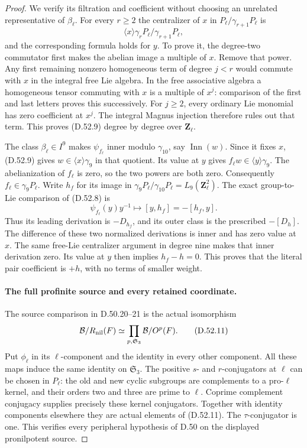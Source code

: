 \begin{proof}
We verify its filtration and coefficient without choosing an
unrelated representative of \(\beta_\ell\). For every
\(r\geq2\) the centralizer of \(x\) in
\(P_\ell/\gamma_{r+1}P_\ell\) is
\[
       \langle x\rangle\gamma_rP_\ell/\gamma_{r+1}P_\ell,
 \tag{D.52.9}
\]
and the corresponding formula holds for \(y\). To prove it,
the degree-two commutator first makes the abelian image a
multiple of \(x\). Remove that power. Any first remaining
nonzero homogeneous term of degree \(j<r\) would commute
with \(x\) in the integral free Lie algebra. In the free
associative algebra a homogeneous tensor commuting with \(x\)
is a multiple of \(x^j\): comparison of the first and last
letters proves this successively. For \(j\geq2\), every
ordinary Lie monomial has zero coefficient at \(x^j\).
The integral Magnus injection therefore rules out that term.
This proves \textup{(D.52.9)} degree by degree over
\(\mathbf Z_\ell\).

The class \(\beta_\ell\in I^9\) makes
\(\psi_{f_\ell}\) inner modulo \(\gamma_{10}\), say
\(\operatorname{Inn}(w)\). Since it fixes \(x\),
\textup{(D.52.9)} gives \(w\in\langle x\rangle\gamma_9\)
in that quotient. Its value at \(y\) gives
\(f_\ell w\in\langle y\rangle\gamma_9\).
The abelianization of \(f_\ell\) is zero, so the two powers
are both zero. Consequently \(f_\ell\in\gamma_9P_\ell\).
Write \(h_f\) for its image in
\(\gamma_9P_\ell/\gamma_{10}P_\ell=L_9(\mathbf Z_\ell^2)\).
The exact group-to-Lie comparison of \textup{(D.52.8)} is
\[
     \psi_{f_\ell}(y)y^{-1}
             \longmapsto [y,h_f]=-[h_f,y].
 \tag{D.52.10}
\]
Thus its leading derivation is \(-D_{h_f}\), and its outer
class is the prescribed \(-[D_h]\). The difference of these
two normalized derivations is inner and has zero value at
\(x\). The same free-Lie centralizer argument in degree nine
makes that inner derivation zero. Its value at \(y\) then
implies \(h_f-h=0\). This proves that the literal pair
coefficient is \(+h\), with no terms of smaller weight.

\paragraph{The full profinite source and every retained coordinate.}
The source comparison in D.50.20--21 is the actual isomorphism
\[
 \mathcal B/R_{\rm nil}(F)
       \simeq\prod_{p,\mathfrak S_3}\mathcal B/O^p(F).
 \tag{D.52.11}
\]
Put \(\phi_\ell\) in its \(\ell\)-component and the
identity in every other component. All these maps induce the
same identity on \(\mathfrak S_3\). The positive
\(s\)- and \(r\)-conjugators at \(\ell\) can be chosen
in \(P_\ell\): the old and new cyclic subgroups are
complements to a pro-\(\ell\) kernel, and their orders two
and three are prime to \(\ell\). Coprime complement
conjugacy supplies precisely these kernel conjugators.
Together with identity components elsewhere they are actual
elements of \textup{(D.52.11)}. The \(\tau\)-conjugator is
one. This verifies every peripheral hypothesis of D.50 on
the displayed pronilpotent source.


\end{proof}
